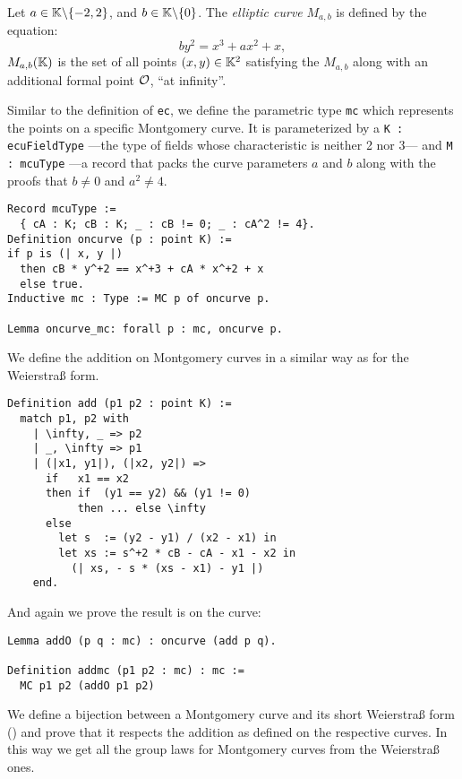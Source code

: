 \begin{dfn}
  Let $a \in \mathbb{K} \backslash \{-2, 2\}$, and $b \in \mathbb{K} \backslash \{ 0\}$.
  The \textit{elliptic curve} $M_{a,b}$ is defined by the equation:
  $$by^2 = x^3 + ax^2 + x,$$
  $M_{a,b}(\mathbb{K})$ is the set of all points $(x,y) \in \mathbb{K}^2$ satisfying the $M_{a,b}$
  along with an additional formal point $\mathcal{O}$, ``at infinity''.
\end{dfn}
Similar to the definition of \texttt{ec}, we define the parametric type \texttt{mc} which
represents the points on a specific Montgomery curve.
It is parameterized by
a \texttt{K : ecuFieldType} ---the type of fields whose characteristic is neither
2 nor 3--- and \texttt{M : mcuType} ---a record that packs the curve
parameters $a$ and $b$ along with the proofs that $b \neq 0$ and $a^2 \neq 4$.
\begin{lstlisting}[language=Coq,belowskip=-0.1 \baselineskip]
Record mcuType :=
  { cA : K; cB : K; _ : cB != 0; _ : cA^2 != 4}.
Definition oncurve (p : point K) :=
if p is (| x, y |)
  then cB * y^+2 == x^+3 + cA * x^+2 + x
  else true.
Inductive mc : Type := MC p of oncurve p.

Lemma oncurve_mc: forall p : mc, oncurve p.
\end{lstlisting}
We define the addition on Montgomery curves in a similar way as for the Weierstra{\ss} form.
\begin{lstlisting}[language=Coq,belowskip=-0.25 \baselineskip]
Definition add (p1 p2 : point K) :=
  match p1, p2 with
    | \infty, _ => p2
    | _, \infty => p1
    | (|x1, y1|), (|x2, y2|) =>
      if   x1 == x2
      then if  (y1 == y2) && (y1 != 0)
           then ... else \infty
      else
        let s  := (y2 - y1) / (x2 - x1) in
        let xs := s^+2 * cB - cA - x1 - x2 in
          (| xs, - s * (xs - x1) - y1 |)
    end.
\end{lstlisting}
And again we prove the result is on the curve:
\begin{lstlisting}[language=Coq]
Lemma addO (p q : mc) : oncurve (add p q).

Definition addmc (p1 p2 : mc) : mc :=
  MC p1 p2 (addO p1 p2)
\end{lstlisting}

We define a bijection between a Montgomery curve and its short Weierstra{\ss} form
() and prove that it respects the addition as defined on the
respective curves. In this way we get all the group laws for Montgomery curves from the Weierstra{\ss} ones.

